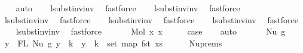 \begin{isabellebody}
\ \ \isamarkupfalse%
\ auto\isanewline
\ \ \isamarkupfalse%
\ lsubst{\isacharunderscore}{\kern0pt}inv{\isacharunderscore}{\kern0pt}inv{}\ \isamarkupfalse%
\ fastforce\isanewline
\ \ \isamarkupfalse%
\ lsubst{\isacharunderscore}{\kern0pt}inv{\isacharunderscore}{\kern0pt}inv{}\ \isamarkupfalse%
\ fastforce\isanewline
\ \ \isamarkupfalse%
\ lsubst{\isacharunderscore}{\kern0pt}inv{\isacharunderscore}{\kern0pt}inv{}\ \isamarkupfalse%
\ fastforce\isanewline
\ \ \isamarkupfalse%
\ lsubst{\isacharunderscore}{\kern0pt}inv{\isacharunderscore}{\kern0pt}inv{}\ \isamarkupfalse%
\ fastforce\isanewline
\ \ \isamarkupfalse%
\ lsubst{\isacharunderscore}{\kern0pt}inv{\isacharunderscore}{\kern0pt}inv{}\ \isamarkupfalse%
\ fastforce\isanewline
\ \ \isamarkupfalse%
\ lsubst{\isacharunderscore}{\kern0pt}inv{\isacharunderscore}{\kern0pt}inv{}\ \isamarkupfalse%
\ fastforce\isanewline
\ \ \isamarkupfalse%
\isanewline
{}\isamarkupfalse%
\isanewline
\ \ \isamarkupfalse%
\ {\isacharparenleft}{\kern0pt}Mol\ x{}\ x{}{\isacharparenright}{\kern0pt}\isanewline
\ \ \isamarkupfalse%
\ \isamarkupfalse%
\ {\isacharquery}{\kern0pt}case\isanewline
\ \ \isamarkupfalse%
\ auto\isanewline
\ \ \isamarkupfalse%
\isanewline
{}\isamarkupfalse%
\isanewline
\ \ \isamarkupfalse%
\ {\isacharparenleft}{\kern0pt}Nu\ g{\isacharprime}{\kern0pt}{\isacharparenright}{\kern0pt}\isanewline
\ \ \isamarkupfalse%
\ {\isachardoublequoteopen}{\isasymforall}y\ {\isasymin}\ FL\ {\isacharparenleft}{\kern0pt}Nu\ g{\isacharprime}{\kern0pt}{\isacharparenright}{\kern0pt}{\isachardot}{\kern0pt}\ y\ {\isachargreater}{\kern0pt}{\isacharequal}{\kern0pt}\ k\ {\isacharminus}{\kern0pt}{\isacharminus}{\kern0pt}{\isachargreater}{\kern0pt}\ y\ {\isacharminus}{\kern0pt}\ k\ {\isasymin}\ set\ {\isacharparenleft}{\kern0pt}map\ fst\ xs{\isacharparenright}{\kern0pt}{\isachardoublequoteclose}\isanewline
\ \ \ \ \isamarkupfalse%
\ Nu{\isachardot}{\kern0pt}prems{\isacharparenleft}{\kern0pt}{}{\isacharparenright}{\kern0pt}\ \isamarkupfalse%

\end{isabellebody}
